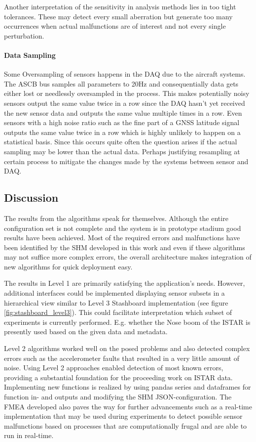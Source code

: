 Another interpretation of the sensitivity in analysis methods lies in too tight tolerances. These may detect every small aberration but generate too many occurrences when actual malfunctions are of interest and not every single perturbation.



\paragraph{Data Sampling}
Some Oversampling of sensors happens in the DAQ due to the aircraft systems.
The ASCB bus samples all parameters to 20Hz and consequentially data gets either lost or needlessly oversampled in the process. This makes potentially noisy sensors output the same value twice in a row since the DAQ hasn't yet received the new sensor data and outputs the same value multiple times in a row. Even sensors with a high noise ratio such as the fine part of a GNSS latitude signal outputs the same value twice in a row which is highly unlikely to happen on a statistical basis. Since this occurs quite often the question arises if the actual sampling may be lower than the actual data. Perhaps justifying resampling at certain process to mitigate the changes made by the systems between sensor and DAQ.



\subsection{Discussion}
The results from the algorithms speak for themselves. Although the entire configuration set is not complete and the system is in prototype stadium good results have been achieved. Most of the required errors and malfunctions have been identified by the SHM developed in this work and even if these algorithms may not suffice more complex errors, the overall architecture makes integration of new algorithms for quick deployment easy.

The results in Level 1 are primarily satisfying the application's needs. However, additional interfaces could be implemented displaying sensor subsets in a hierarchical view similar to Level 3 Stashboard implementation (see figure \ref{fig:stashboard_level3}). This could facilitate interpretation which subset of experiments is currently performed. E.g. whether the Nose boom of the ISTAR is presently used based on the given data and metadata.

Level 2 algorithms worked well on the posed problems and also detected complex errors such as the accelerometer faults that resulted in a very little amount of noise. Using Level 2 approaches enabled detection of most known errors, providing a substantial foundation for the proceeding work on ISTAR data. Implementing new functions is realized by using pandas series and dataframes for function in- and outputs and modifying the SHM JSON-configuration.
The FMEA developed also paves the way for further advancements such as a real-time implementation that may be used during experiments to detect possible sensor malfunctions based on processes that are computationally frugal and are able to run in real-time.

